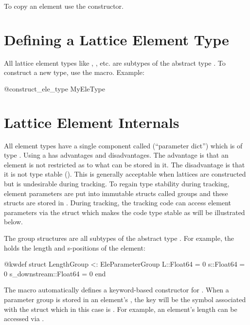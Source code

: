 To copy an element use the  constructor.

\section{Defining a Lattice Element Type}
\label{s:ele.type}

All lattice element types like , , etc. are subtypes of the abstract type
. To construct a new type, use the  macro. Example:
\begin{example}
  @construct_ele_type MyEleType
\end{example}

\section{Lattice Element Internals}
\label{s:ele.inside}

All element types have a single component called  (``parameter dict'') which is of
type . Using a  has advantages and disadvantages. The advantage is
that an element is not restricted as to what can be stored in it. The disadvantage is that it is not
type stable (). This is generally acceptable when lattices are constructed but
is undesirable during tracking. To regain type stability during tracking, element parameters are
put into immutable structs called  groups 
and these structs are stored in . During tracking, the tracking
code can access element parameters via the struct which makes the code type stable as will be illustrated below.

The  group structures are all subtypes of the abstract type .
For example, the  holds the length and s-positions of the element:
\begin{example}
  @kwdef struct LengthGroup <: EleParameterGroup
    L::Float64 = 0
    s::Float64 = 0
    s_downstream::Float64 = 0
  end
\end{example}
The \vn{\@kwdef} macro automatically defines a keyword-based constructor for . 
When a parameter group is stored in an element's , the key will be the symbol associated
with the struct which in this case is . For example, an element's length can be
accessed via . 




